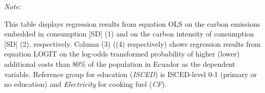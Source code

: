 \begin{table}[htbp!]
\begin{adjustbox}{width = 1\textwidth, max height = 0.95\textheight, center}
\begin{threeparttable}[b]
         \begin{tablenotes}\item \medskip \textit{Note:}
            \item This table displays regression results from equation OLS on the carbon emissions embedded in consumption [SD] (1) and on the carbon intensity of consumption [SD] (2), respectively. 
                                      Column (3) ((4) respectively) shows regression results from equation LOGIT on the log-odds transformed probability of higher (lower) additional costs than 80\% of the population in Ecuador as the dependent variable. Reference group for education (\textit{ISCED}) is ISCED-level 0-1 (primary or no education) and \textit{Electricity} for cooking fuel (\textit{CF}).
         \end{tablenotes}
      \end{threeparttable}
   \end{adjustbox}
\end{table}



